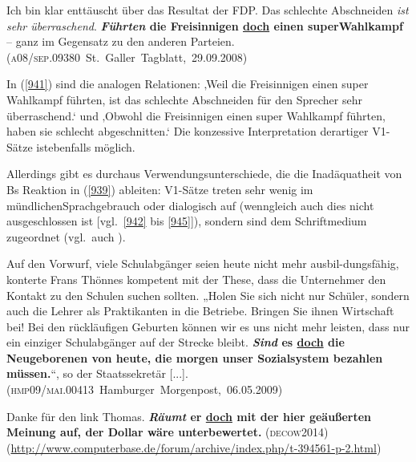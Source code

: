 {\begin{exe}
	\ex\label{941}

	Ich bin klar enttäuscht über das Resultat der FDP. Das schlechte Abschneiden \emph{ist sehr überraschend}. \textbf{\textit{Führten} die Freisinnigen 		\ul{doch} einen super\linebreak Wahlkampf} – ganz im Gegensatz zu den anderen Parteien. 
	\newline\hbox{}\hfill\hbox{(\textsc{a08/sep.09380} St. Galler Tagblatt, 29.09.2008)}
\end{exe}
In (\ref{941}) sind die analogen Relationen: ‚Weil die Freisinnigen einen super Wahlkampf führten, ist das schlechte Abschneiden für den Sprecher sehr überrasch\-end.‘ und ‚Obwohl die Freisinnigen einen super Wahlkampf führten, haben sie schlecht abgeschnitten.‘ Die konzessive Interpretation derartiger V1-Sätze ist\linebreak ebenfalls möglich.

Allerdings gibt es durchaus Verwendungsunterschiede, die die Inadäquatheit von Bs Reaktion in (\ref{939}) ableiten: V1-Sätze treten sehr wenig im mündlichen\linebreak Sprachgebrauch oder dialogisch auf (wenngleich auch dies nicht ausgeschlossen ist [vgl.\ \ref{942} bis \ref{945}]), sondern sind dem Schriftmedium zugeordnet (vgl.\ auch \citealt[157]{Oennerfors1997}).
	
\begin{exe}
	\ex\label{942}
{\sloppy
	Auf den Vorwurf, viele Schulabgänger seien heute nicht mehr ausbil-\linebreak dungsfähig, konterte Frans Thön\-nes kompetent mit der These, dass die Unternehmer den 		Kontakt zu den Schulen suchen sollten. „Holen Sie sich nicht nur Schüler, sondern auch die Lehrer als Praktikanten in die Betriebe. Bringen Sie 		ihnen Wirtschaft bei! Bei den rückläufigen Geburten können wir es uns nicht mehr leisten, dass nur ein einziger Schulabgänger auf der Strecke bleibt. 		\textbf{\textit{Sind} es \ul{doch} die Neugeborenen von heute, die morgen unser Sozialsystem bezahlen müssen.}“, so der Staatssekretär 		[...].}
	\newline  
	\hbox{}\hfill\hbox{(\textsc{hmp09/mai.00413} Hamburger Morgenpost, 06.05.2009)}
\end{exe}	
	
\begin{exe}
	\ex\label{943}

	Danke für den link Thomas. \textbf{\textit{Räumt} er \ul{doch} mit der hier geäußerten Meinung auf, der Dollar wäre unterbewertet.                                                                                           	}
	\hfill\hbox{\scshape(decow2014)}
	\newline  
	{\scriptsize(\url{http://www.computerbase.de/forum/archive/index.php/t-394561-p-2.html})}
\end{exe}		
	 
}
